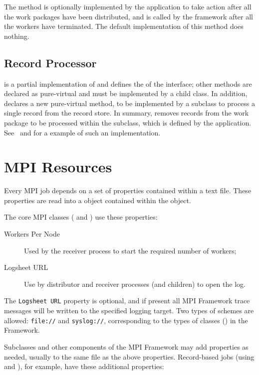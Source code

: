 The  method is optionally implemented by the
application to take action after all the work packages have been distributed,
and is called by the framework after all the workers have terminated. The
default implementation of this method does nothing.

\subsection{Record Processor}
\label{sec-recordprocessor}
 is a partial implementation of 
 and defines the 
of the  interface; other methods are declared as
pure-virtual and must be implemented by a child class. In addition,
 declares a new pure-virtual method,
 to be implemented by a subclass to process a single
record from the record store. In summary,  removes
records from the work package to be processed within the subclass,
which is defined by the application.
See~ and  for a example of
such an implementation.

\section{MPI Resources}
\label{sec-mpiresources}
Every MPI job depends on a set of properties contained within a text file.
These properties are read into a  object contained within
the  object.

The core MPI classes ( and ) use these
properties:
\begin{description}
\item[Workers Per Node] Used by the receiver process to start the
required number of workers;
\item[Logsheet URL] Use by distributor and receiver processes
(and children) to open the log.
\end{description}

The \verb=Logsheet URL= property is optional, and if present all MPI Framework
trace messages will be written to the specified logging target. Two types of
\URL schemes are allowed: \verb=file://= and \verb=syslog://=, corresponding
to the types of  classes () in the
Framework.

Subclasses and other components of the MPI Framework may add properties as
needed, usually to the same file as the above properties. Record-based jobs
(using  and ), for example,
have these additional properties:

